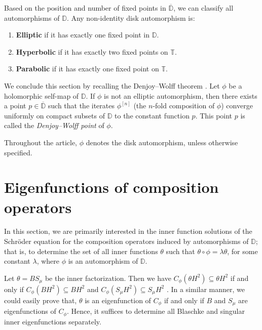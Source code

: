 \documentclass[12pt, reqno]{amsart}
\theoremstyle{definition}
\numberwithin{equation}{section}
\begin{document}
 
Based on the position and number of fixed points in $\overline{\mathbb{D}}$, we can classify all automorphisms of $\mathbb{D}$. Any non-identity disk automorphism is:

\begin{enumerate}
	\item \textbf{Elliptic} if it has exactly one fixed point in $\mathbb{D}$.
	\item \textbf{Hyperbolic} if it has exactly two fixed points on $\mathbb{T}$.
	\item \textbf{Parabolic} if it has exactly one fixed point on $\mathbb{T}$.
\end{enumerate}

We conclude this section by recalling the Denjoy–Wolff theorem \cite[Page~78]{shapiro1}. Let $\phi$ be a holomorphic self-map of $\mathbb{D}$. If $\phi$ is not an elliptic automorphism, then there exists a point $p \in \overline{\mathbb{D}}$ such that the iterates $\phi^{[n]}$ (the $n$-fold composition of $\phi$) converge uniformly on compact subsets of $\mathbb{D}$ to the constant function $p$. This point $p$ is called the \emph{Denjoy–Wolff point} of $\phi$.

Throughout the article, $\phi$ denotes the disk automorphism, unless otherwise specified. 


\section{Eigenfunctions of composition operators}
In this section, we are primarily interested in  the inner function solutions of the Schröder equation for the composition operators induced by automorphisms of $\mathbb{D}$; that is, to determine the set of all inner functions $\theta$ such that $\theta \circ \phi=\lambda \theta$, for some constant $\lambda$, where $\phi$ is an automorphism of $\mathbb{D}$. 

Let $\theta=BS_\mu$ be the inner factorization. Then we have $C_\phi(\theta H^2)\subseteq \theta H^2$ if and only if $C_\phi(BH^2)\subseteq B H^2$  and $C_\phi(S_\mu H^2)\subseteq S_\mu H^2$ \cite[Corollary 3.11]{article1}. In a similar manner, we could easily prove that, $\theta$ is an eigenfunction of $C_\phi$ if and only if $B$ and $S_\mu$ are eigenfunctions of $C_\phi$. Hence, it suffices to determine all Blaschke and singular inner eigenfunctions separately.
\end{document}
